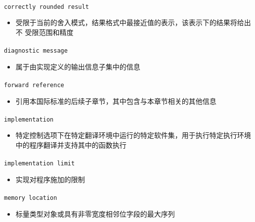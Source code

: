 \paragraph{}
\texttt{correctly rounded result}
\begin{itemize}
  \item[]{受限于当前的舍入模式，结果格式中最接近值的表示，该表示下的结果将给出不
    受限范围和精度}
\end{itemize}

\paragraph{}
\texttt{diagnostic message}
\begin{itemize}
  \item[]{属于由实现定义的输出信息子集中的信息}
\end{itemize}

\paragraph{}
\texttt{forward reference}
\begin{itemize}
  \item[]{引用本国际标准的后续子章节，其中包含与本章节相关的其他信息}
\end{itemize}

\paragraph{}
\texttt{implementation}
\begin{itemize}
  \item[]{特定控制选项下在特定翻译环境中运行的特定软件集，用于执行特定执行环境
    中的程序翻译并支持其中的函数执行}
\end{itemize}

\paragraph{}
\texttt{implementation limit}
\begin{itemize}
  \item[]{实现对程序施加的限制}
\end{itemize}

\paragraph{}
\texttt{memory location}
\begin{itemize}
  \item[]{标量类型对象或具有非零宽度相邻位字段的最大序列}
\end{itemize}


